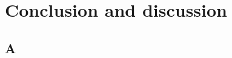 
\chapter{Conclusion and discussion}
\label{chap:discussion}
\ifpdf
    \graphicspath{{Chapter8/Figs/Raster/}{Chapter8/Figs/PDF/}{Chapter8/Figs/}}
\else
    \graphicspath{{Chapter8/Figs/Vector/}{Chapter8/Figs/}}
\fi

\section{A}
